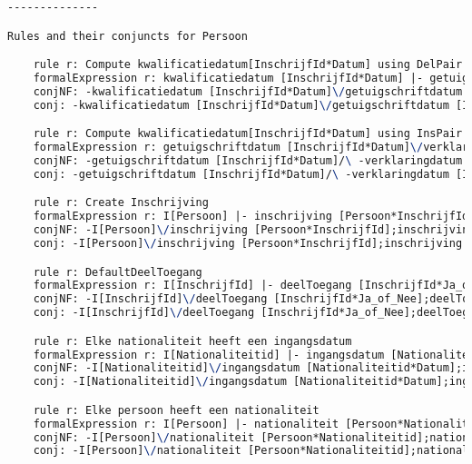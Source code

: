 \begin{lstlisting}[language=TeX]
--------------

Rules and their conjuncts for Persoon

    rule r: Compute kwalificatiedatum[InschrijfId*Datum] using DelPair
    formalExpression r: kwalificatiedatum [InschrijfId*Datum] |- getuigschriftdatum [InschrijfId*Datum]\/verklaringdatum [InschrijfId*Datum]\/diplomadatum [InschrijfId*Datum]
    conjNF: -kwalificatiedatum [InschrijfId*Datum]\/getuigschriftdatum [InschrijfId*Datum]\/verklaringdatum [InschrijfId*Datum]\/diplomadatum [InschrijfId*Datum]
    conj: -kwalificatiedatum [InschrijfId*Datum]\/getuigschriftdatum [InschrijfId*Datum]\/verklaringdatum [InschrijfId*Datum]\/diplomadatum [InschrijfId*Datum]

    rule r: Compute kwalificatiedatum[InschrijfId*Datum] using InsPair
    formalExpression r: getuigschriftdatum [InschrijfId*Datum]\/verklaringdatum [InschrijfId*Datum]\/diplomadatum [InschrijfId*Datum] |- kwalificatiedatum [InschrijfId*Datum]
    conjNF: -getuigschriftdatum [InschrijfId*Datum]/\ -verklaringdatum [InschrijfId*Datum]/\ -diplomadatum [InschrijfId*Datum]\/kwalificatiedatum [InschrijfId*Datum]
    conj: -getuigschriftdatum [InschrijfId*Datum]/\ -verklaringdatum [InschrijfId*Datum]/\ -diplomadatum [InschrijfId*Datum]\/kwalificatiedatum [InschrijfId*Datum]

    rule r: Create Inschrijving
    formalExpression r: I[Persoon] |- inschrijving [Persoon*InschrijfId];inschrijving [Persoon*InschrijfId]~
    conjNF: -I[Persoon]\/inschrijving [Persoon*InschrijfId];inschrijving [Persoon*InschrijfId]~
    conj: -I[Persoon]\/inschrijving [Persoon*InschrijfId];inschrijving [Persoon*InschrijfId]~

    rule r: DefaultDeelToegang
    formalExpression r: I[InschrijfId] |- deelToegang [InschrijfId*Ja_of_Nee];deelToegang [InschrijfId*Ja_of_Nee]~
    conjNF: -I[InschrijfId]\/deelToegang [InschrijfId*Ja_of_Nee];deelToegang [InschrijfId*Ja_of_Nee]~
    conj: -I[InschrijfId]\/deelToegang [InschrijfId*Ja_of_Nee];deelToegang [InschrijfId*Ja_of_Nee]~

    rule r: Elke nationaliteit heeft een ingangsdatum
    formalExpression r: I[Nationaliteitid] |- ingangsdatum [Nationaliteitid*Datum];ingangsdatum [Nationaliteitid*Datum]~
    conjNF: -I[Nationaliteitid]\/ingangsdatum [Nationaliteitid*Datum];ingangsdatum [Nationaliteitid*Datum]~
    conj: -I[Nationaliteitid]\/ingangsdatum [Nationaliteitid*Datum];ingangsdatum [Nationaliteitid*Datum]~

    rule r: Elke persoon heeft een nationaliteit
    formalExpression r: I[Persoon] |- nationaliteit [Persoon*Nationaliteitid];nationaliteit [Persoon*Nationaliteitid]~
    conjNF: -I[Persoon]\/nationaliteit [Persoon*Nationaliteitid];nationaliteit [Persoon*Nationaliteitid]~
    conj: -I[Persoon]\/nationaliteit [Persoon*Nationaliteitid];nationaliteit [Persoon*Nationaliteitid]~


\end{lstlisting}
